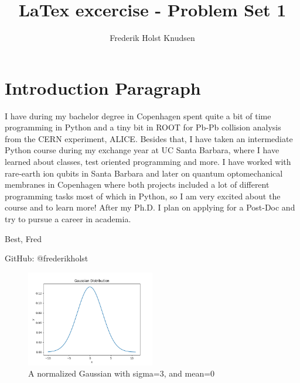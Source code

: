 \documentclass[11pt]{article}
\title{LaTex excercise - Problem Set 1}
\author{Frederik Holst Knudsen}
\begin{document}
\maketitle

\section{Introduction Paragraph}
I have during my bachelor degree in Copenhagen spent quite a bit of time programming in Python and a tiny bit in ROOT for Pb-Pb collision analysis from the CERN experiment, ALICE. Besides that, I have taken an intermediate Python course during my exchange year at UC Santa Barbara, where I have learned about classes, test oriented programming and more. I have worked with rare-earth ion qubits in Santa Barbara and later on quantum optomechanical membranes in Copenhagen where both projects included a lot of different programming tasks most of which in Python, so I am very excited about the course and to learn more! After my Ph.D. I plan on applying for a Post-Doc and try to pursue a career in academia. 

Best, 
Fred

GitHub: @frederikholst

\label{sec:intro}

\begin{figure}[b!]
\centering
\includegraphics[width=0.5\textwidth]{gaussian.png}
\caption{ \label{fig:example} A normalized Gaussian with sigma=3, and mean=0}
\end{figure}
\end{document}
